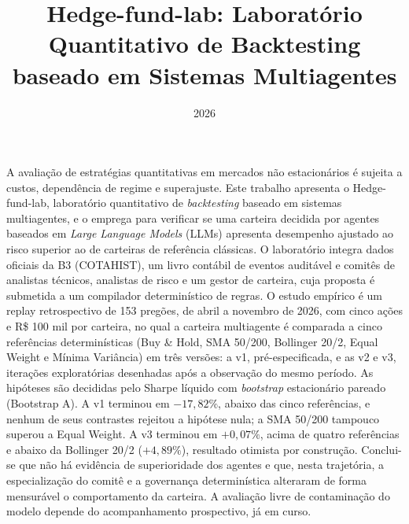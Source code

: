 \documentclass{eic-bcc-tcc}
\title{Hedge-fund-lab: Laboratório Quantitativo de Backtesting baseado em Sistemas Multiagentes}
\date{2026}
\begin{document}
\maketitle

\makeapproval

\begin{resumo}
A avaliação de estratégias quantitativas em mercados não estacionários é sujeita a custos, dependência de regime e superajuste. Este trabalho apresenta o Hedge-fund-lab, laboratório quantitativo de \textit{backtesting} baseado em sistemas multiagentes, e o emprega para verificar se uma carteira decidida por agentes baseados em \textit{Large Language Models} (LLMs) apresenta desempenho ajustado ao risco superior ao de carteiras de referência clássicas. O laboratório integra dados oficiais da B3 (COTAHIST), um livro contábil de eventos auditável e comitês de analistas técnicos, analistas de risco e um gestor de carteira, cuja proposta é submetida a um compilador determinístico de regras. O estudo empírico é um replay retrospectivo de 153 pregões, de abril a novembro de 2026, com cinco ações e R\$ 100 mil por carteira, no qual a carteira multiagente é comparada a cinco referências determinísticas (Buy \& Hold, SMA 50/200, Bollinger 20/2, Equal Weight e Mínima Variância) em três versões: a v1, pré-especificada, e as v2 e v3, iterações exploratórias desenhadas após a observação do mesmo período. As hipóteses são decididas pelo Sharpe líquido com \textit{bootstrap} estacionário pareado (Bootstrap A). A v1 terminou em $-17{,}82\%$, abaixo das cinco referências, e nenhum de seus contrastes rejeitou a hipótese nula; a SMA 50/200 tampouco superou a Equal Weight. A v3 terminou em $+0{,}07\%$, acima de quatro referências e abaixo da Bollinger 20/2 ($+4{,}89\%$), resultado otimista por construção. Conclui-se que não há evidência de superioridade dos agentes e que, nesta trajetória, a especialização do comitê e a governança determinística alteraram de forma mensurável o comportamento da carteira. A avaliação livre de contaminação do modelo depende do acompanhamento prospectivo, já em curso.
\end{resumo}
\end{document}
